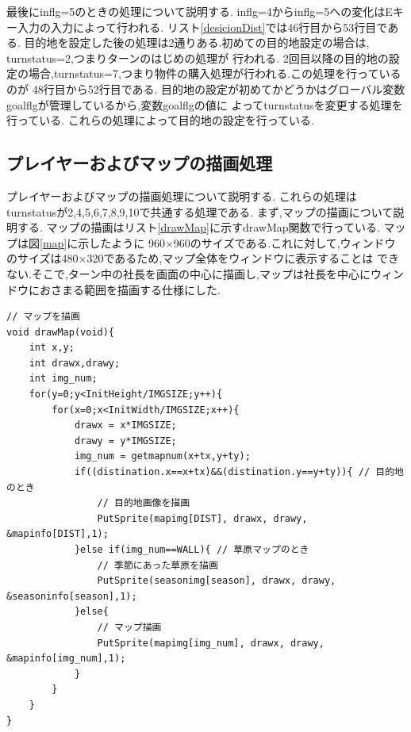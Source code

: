 \documentclass[a4j]{jarticle}
\begin{document}
            最後にinflg=5のときの処理について説明する. inflg=4からinflg=5への変化はEキー入力の入力によって行われる.
            リスト\ref{desicionDist}では46行目から53行目である.
            目的地を設定した後の処理は2通りある.初めての目的地設定の場合は, turnstatus=2,つまりターンのはじめの処理が
            行われる. 2回目以降の目的地の設定の場合,turnstatus=7,つまり物件の購入処理が行われる.この処理を行っているのが
            48行目から52行目である. 目的地の設定が初めてかどうかはグローバル変数goalflgが管理しているから,変数goalflgの値に
            よってturnstatusを変更する処理を行っている. これらの処理によって目的地の設定を行っている.

    \subsection{プレイヤーおよびマップの描画処理}
    プレイヤーおよびマップの描画処理について説明する. これらの処理はturnstatusが2,4,5,6,7,8,9,10で共通する処理である.
    まず,マップの描画について説明する. マップの描画はリスト\ref{drawMap}に示すdrawMap関数で行っている. マップは図\ref{map}に示したように
    960$\times$960のサイズである.これに対して,ウィンドウのサイズは480$\times$320であるため,マップ全体をウィンドウに表示することは
    できない.そこで,ターン中の社長を画面の中心に描画し,マップは社長を中心にウィンドウにおさまる範囲を描画する仕様にした.\\
        \begin{lstlisting}[basicstyle=\ttfamily\footnotesize, frame=single,label=drawMap,caption=drawMap関数]
// マップを描画
void drawMap(void){
    int x,y;
    int drawx,drawy;
    int img_num;
    for(y=0;y<InitHeight/IMGSIZE;y++){
        for(x=0;x<InitWidth/IMGSIZE;x++){
            drawx = x*IMGSIZE;
            drawy = y*IMGSIZE;
            img_num = getmapnum(x+tx,y+ty);
            if((distination.x==x+tx)&&(distination.y==y+ty)){ // 目的地のとき
                // 目的地画像を描画
                PutSprite(mapimg[DIST], drawx, drawy, &mapinfo[DIST],1);
            }else if(img_num==WALL){ // 草原マップのとき
                // 季節にあった草原を描画
                PutSprite(seasonimg[season], drawx, drawy, &seasoninfo[season],1);
            }else{
                // マップ描画
                PutSprite(mapimg[img_num], drawx, drawy, &mapinfo[img_num],1);
            }
        }
    }
}
        \end{lstlisting}
\end{document}
